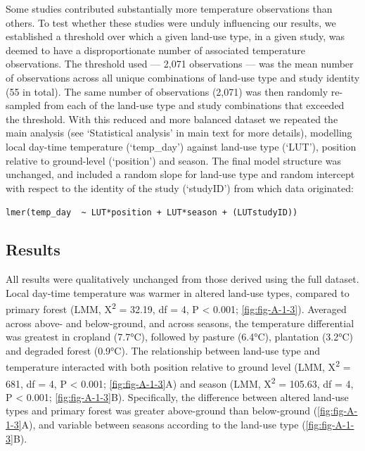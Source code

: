 \documentclass[12pt,a4paper,]{report}
\theoremstyle{definition}
\theoremstyle{definition}
\theoremstyle{definition}
\theoremstyle{remark}
\begin{document}
Some studies contributed substantially more temperature observations
than others. To test whether these studies were unduly influencing our
results, we established a threshold over which a given land-use type, in
a given study, was deemed to have a disproportionate number of
associated temperature observations. The threshold used --- 2,071
observations --- was the mean number of observations across all unique
combinations of land-use type and study identity (55 in total). The same
number of observations (2,071) was then randomly re-sampled from each of
the land-use type and study combinations that exceeded the threshold.
With this reduced and more balanced dataset we repeated the main
analysis (see `Statistical analysis' in main text for more details),
modelling local day-time temperature (`temp\_day') against land-use type
(`LUT'), position relative to ground-level (`position') and season. The
final model structure was unchanged, and included a random slope for
land-use type and random intercept with respect to the identity of the
study (`studyID') from which data originated:

\texttt{lmer(temp\_day\ \ \textasciitilde{}\ LUT*position\ +\ LUT*season\ +\ (LUT\textbar{}studyID))}

\subsection{Results}\label{results-3}

All results were qualitatively unchanged from those derived using the
full dataset. Local day-time temperature was warmer in altered land-use
types, compared to primary forest (LMM, Χ\textsuperscript{2} = 32.19, df
= 4, P \textless{} 0.001; \autoref{fig:fig-A-1-3}). Averaged across
above- and below-ground, and across seasons, the temperature
differential was greatest in cropland (7.7°C), followed by pasture
(6.4°C), plantation (3.2°C) and degraded forest (0.9°C). The
relationship between land-use type and temperature interacted with both
position relative to ground level (LMM, Χ\textsuperscript{2} = 681, df =
4, P \textless{} 0.001; \autoref{fig:fig-A-1-3}A) and season (LMM,
Χ\textsuperscript{2} = 105.63, df = 4, P \textless{} 0.001;
\autoref{fig:fig-A-1-3}B). Specifically, the difference between altered
land-use types and primary forest was greater above-ground than
below-ground (\autoref{fig:fig-A-1-3}A), and variable between seasons
according to the land-use type (\autoref{fig:fig-A-1-3}B).

\pagebreak
\end{document}
